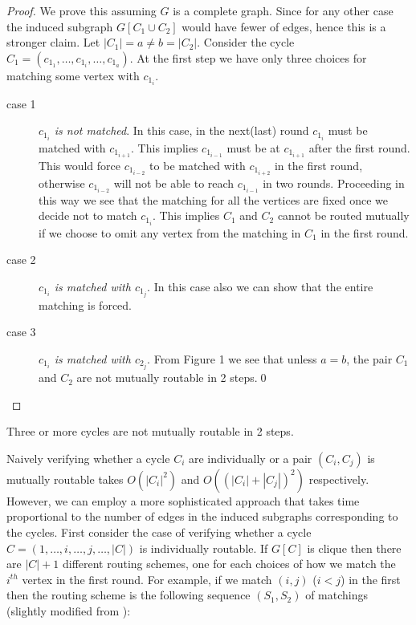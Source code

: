 \documentclass[runningheads,a4paper]{llncs}
\begin{document}
\begin{proof}
	We prove this assuming $G$ is a complete graph. Since for any other case the induced subgraph $G[C_1\cup C_2]$ would have fewer of edges, hence this is a stronger claim. Let $|C_1| = a \neq  b = |C_2|$. Consider the cycle $C_1=(c_{1_1},\ldots,c_{1_i},\ldots,c_{1_a})$. At the first step we have only three choices for matching some vertex with $c_{1_i}$. 
	\begin{description}
		\item[case 1] \textit{$c_{1_i}$ is not matched}. In this case, in the next(last) round $c_{1_i}$ must be matched with $c_{1_{i+1}}$. This implies $c_{1_{i-1}}$ must be at $c_{1_{i+1}}$ after the first round. This would force $c_{1_{i-2}}$ to be matched with $c_{1_{i+2}}$ in the first round, otherwise $c_{1_{i-2}}$ will not be able to reach $c_{1_{i-1}}$ in two rounds. Proceeding in this way we see that the matching for all the vertices are fixed once we decide not to match $c_{1_i}$. This implies $C_1$ and $C_2$ cannot be routed mutually if we choose to omit any vertex from the matching in $C_1$ in the first round.
		\item[case 2] \textit{$c_{1_i}$ is matched with $c_{1_j}$}. In  this case also we can show that the entire matching is forced. 
		\item[case 3] \textit{$c_{1_i}$ is matched with $c_{2_j}$}. From Figure 1 we see that unless $a  = b$,  the pair $C_1$ and $C_2$ are not mutually routable in 2 steps.\qed
	\end{description}
\end{proof}

\begin{corollary}
	Three or more cycles are not mutually routable in 2 steps. 
\end{corollary}

\noindent Naively verifying whether a cycle $C_i$ are individually or a pair $(C_i,C_j)$ is mutually routable takes $O(|C_i|^2)$ and $O((|C_i| + |C_j|)^2)$ respectively. However, we can employ a more sophisticated approach that takes time proportional to the number of edges in the induced subgraphs corresponding to the cycles. First consider the case of verifying whether a cycle $C=(1,\ldots,i,\ldots,j,\ldots,|C|)$ is individually routable. If $G[C]$ is clique then there are $|C|+1$ different routing schemes, one for each choices of how we match the $i^{th}$ vertex in the first round. For example, if we match $(i,j)$ ($i < j$) in the first then the routing scheme is the following sequence  $(S_1,S_2)$ of matchings (slightly modified from \cite{5}): 
\end{document}
